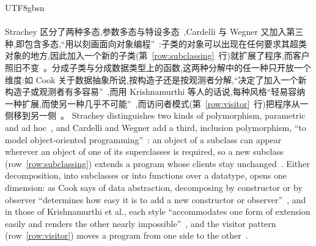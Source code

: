 \begin{CJK*}{UTF8}{gbsn}
\paragraph{}
\ifPaperChinese
Strachey 区分了两种多态,参数多态与特设多态~\cite{strachey2000-fundamental-concepts},Cardelli 与 Wegner 又加入第三种,即包含多态,``用以刻画面向对象编程''~\cite[第~475~页]{cardelli1985-understanding-types}:子类的对象可以出现在任何要求其超类对象的地方,因此加入一个新的子类(第~\ref{row:subclassing}~行)就扩展了程序,而客户照旧不变~\cite[第~478~页]{cardelli1985-understanding-types}\cite[第~499~页]{meyer1997-object-oriented-software-construction}。分成子类与分成数据类型上的函数,这两种分解中的任一种只开放一个维度:如 Cook 关于数据抽象所说,按构造子还是按观测者分解,``决定了加入一个新构造子或观测者有多容易''~\cite{cook1991-object-oriented-versus-abstract-data-types}\cite[第~131~页]{clifton2000-multijava},而用 Krishnamurthi 等人的话说,每种风格``轻易容纳一种扩展,而使另一种几乎不可能''~\cite[第~92~页]{krishnamurthi1998-synthesizing-object-oriented-functional},而访问者模式(第~\ref{row:visitor}~行)把程序从一侧移到另一侧~\cite[第~335--336~页]{gamma1994-design-patterns}。
\else
Strachey distinguishes two kinds of polymorphism, parametric and ad
hoc~\cite{strachey2000-fundamental-concepts}, and Cardelli and Wegner add a third, inclusion
polymorphism, ``to model object-oriented programming''~\cite[p.~475]{cardelli1985-understanding-types}:
an object of a subclass can appear wherever an object of one of its superclasses is required, so a new
subclass (row~\ref{row:subclassing}) extends a program whose clients stay
unchanged~\cite[p.~478]{cardelli1985-understanding-types}\cite[p.~499]{meyer1997-object-oriented-software-construction}.
Either decomposition, into subclasses or into functions over a datatype, opens one dimension: as Cook says of
data abstraction, decomposing by constructor or by observer ``determines how easy it is to add a new
constructor or observer''~\cite{cook1991-object-oriented-versus-abstract-data-types}\cite[p.~131]{clifton2000-multijava},
and in those of Krishnamurthi et al., each style ``accommodates one form of extension easily and renders
the other nearly impossible''~\cite[p.~92]{krishnamurthi1998-synthesizing-object-oriented-functional},
and the visitor pattern (row~\ref{row:visitor}) moves a program from one side to the
other~\cite[pp.~335--336]{gamma1994-design-patterns}.
\fi


\end{CJK*}
